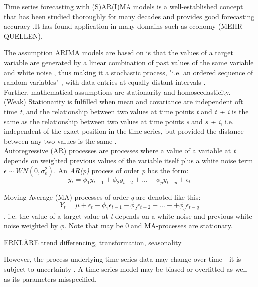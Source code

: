 \documentclass[12pt,titlepage]{article}
\begin{document}
Time series forecasting with (S)AR(I)MA models is a well-established concept that has been studied thoroughly for many decades and provides good forecasting accuracy \citep{Arlt.2017, Khandelwal.2015}.It has found application in many domains such as economy (MEHR QUELLEN), 

The assumption ARIMA models are based on is that the values of a target variable are generated by a linear combination of past values of the same variable and white noise \citep{Khandelwal.2015}, thus making it a stochastic process, "i.e. an ordered sequence of random variables" \citep{Andreoni.2006}, with data entries at equally distant intervals \citep{Hunt.2003}.\\
Further, mathematical assumptions are stationarity and homoscedasticity.\\
(Weak) Stationarity is fulfilled when mean and covariance are independent oft time \textit{t}, and the relationship between two values at time points \textit{t} and \textit{t + i} is the same as the relationship between two values at time points \textit{s} and \textit{s + i}, i.e. independent of the exact position in the time series, but provided the distance between any two values is the same \citep{Vogel.2015}.\\


Autoregressive (AR) processes are processes where a value of a variable at \textit{t} depends on weighted previous values of the variable itself plus a white noise term $\epsilon \sim  WN(0, \sigma_{\epsilon}^2)$. An \textit{AR(p)} process of order \textit{p} has the form:
\begin{equation}
y_{t} = \phi_{1} y_{t-1} + \phi_{2} y_{t-2} + ... + \phi_{p} y_{t-p} +\epsilon_{t}
\end{equation}

Moving Average (MA) processes of order \textit{q} are denoted like this:
\begin{equation}
Y_{t} = \mu + \epsilon_{t} - \phi_{1}\epsilon_{t-1} - \phi_{2}\epsilon_{t-2} - ... - +\phi_{q}\epsilon_{t-q}
\end{equation}
, i.e. the value of a target value at \textit{t} depends on a white noise and previous white noise weighted by $\phi$. Note that \mu may be 0 and MA-processes are stationary.

ERKLÄRE trend differencing, transformation, seasonality

However, the process underlying time series data may change over time - it is subject to uncertainty \citep{Adhikari.2015}. A time series model may be biased or overfitted as well as its parameters misspecified. \\
\end{document}
